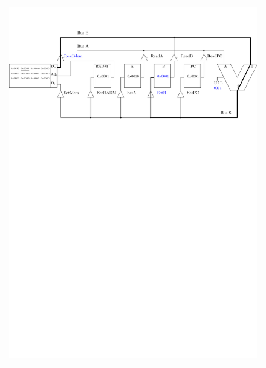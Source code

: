 \begin{figure}[htbp]
\begin{tabular}{c}
\includegraphics[width=\linewidth]{Figs/premier_chemin_ldb_2.pdf}\\

\end{tabular}
\end{figure}
